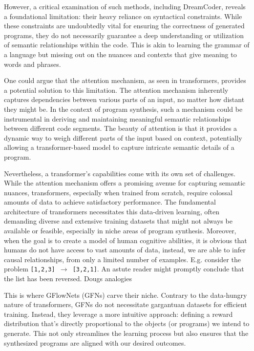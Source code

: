 However, a critical examination of such methods, including DreamCoder, reveals a foundational limitation: their heavy reliance on syntactical constraints. While these constraints are undoubtedly vital for ensuring the correctness of generated programs, they do not necessarily guarantee a deep understanding or utilization of semantic relationships within the code. This is akin to learning the grammar of a language but missing out on the nuances and contexts that give meaning to words and phrases.

One could argue that the attention mechanism, as seen in transformers, provides a potential solution to this limitation. The attention mechanism inherently captures dependencies between various parts of an input, no matter how distant they might be. In the context of program synthesis, such a mechanism could be instrumental in deriving and maintaining meaningful semantic relationships between different code segments. The beauty of attention is that it provides a dynamic way to weigh different parts of the input based on context, potentially allowing a transformer-based model to capture intricate semantic details of a program.

Nevertheless, a transformer's capabilities come with its own set of challenges. While the attention mechanism offers a promising avenue for capturing semantic nuances, transformers, especially when trained from scratch, require colossal amounts of data to achieve satisfactory performance. The fundamental architecture of transformers necessitates this data-driven learning, often demanding diverse and extensive training datasets that might not always be available or feasible, especially in niche areas of program synthesis. Moreover, when the goal is to create a model of human cognitive abilities, it is obvious that humans do not have access to vast amounts of data, instead, we are able to infer causal relationships, from only a limited number of examples. E.g. consider the problem \texttt{[1,2,3] $\rightarrow$ [3,2,1]}. An astute reader might promptly conclude that the list has been reversed. 
Dougs analogies 

This is where GFlowNets (GFNs) carve their niche. Contrary to the data-hungry nature of transformers, GFNs do not necessitate gargantuan datasets for efficient training. Instead, they leverage a more intuitive approach: defining a reward distribution that's directly proportional to the objects (or programs) we intend to generate. This not only streamlines the learning process but also ensures that the synthesized programs are aligned with our desired outcomes.

